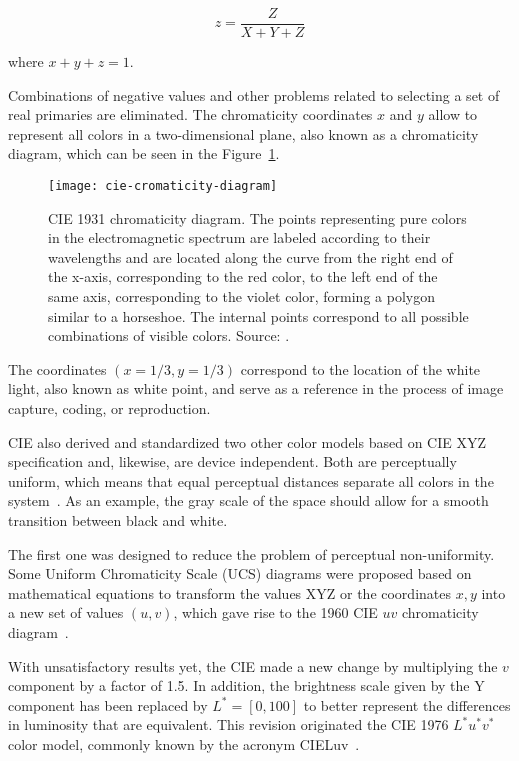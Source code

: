 \begin{equation}
  z = \frac{Z}{X + Y + Z}
\label{eq:cie_z}
\end{equation}

where $x + y+ z = 1$.

Combinations of negative values and other problems related to selecting a set of real primaries are eliminated. The chromaticity coordinates $x$ and $y$ allow to represent all colors in a two-dimensional plane, also known as a chromaticity diagram, which can be seen in the Figure~\ref{fig:cie-cromaticity-diagram}.

\begin{figure}[!ht]
  \centering
  \texttt{[image: cie-cromaticity-diagram]}
  \caption[CIE 1931 chromaticity diagram]{CIE 1931 chromaticity diagram. The points representing pure colors in the electromagnetic spectrum are labeled according to their wavelengths and are located along the curve from the right end of the x-axis, corresponding to the red color, to the left end of the same axis, corresponding to the violet color, forming a polygon similar to a horseshoe. The internal points correspond to all possible combinations of visible colors. Source: \citet{ben:09}.}
  \label{fig:cie-cromaticity-diagram} 
\end{figure}

The coordinates $(x = 1/3, y = 1/3)$ correspond to the location of the white light, also known as white point, and serve as a reference in the process of image capture, coding, or reproduction.

CIE also derived and standardized two other color models based on CIE XYZ specification and, likewise, are device independent. Both are perceptually uniform, which means that equal perceptual distances separate all colors in the system~\citep{vezhnevets:03}. As an example, the gray scale of the space should allow for a smooth transition between black and white.

The first one was designed to reduce the problem of perceptual non-uniformity. Some Uniform Chromaticity Scale (UCS) diagrams were proposed based on mathematical equations to transform the values XYZ or the coordinates $x, y$ into a new set of values $(u, v)$, which gave rise to the 1960 CIE $uv$ chromaticity diagram~\citep{gevers:12}.

With unsatisfactory results yet, the CIE made a new change by multiplying the $v$ component by a factor of 1.5. In addition, the brightness scale given by the Y component has been replaced by $L^* = [0, 100]$ to better represent the differences in luminosity that are equivalent. This revision originated the CIE 1976 $L^*u^*v^*$ color model, commonly known by the acronym CIELuv~\citep{gevers:12}.

